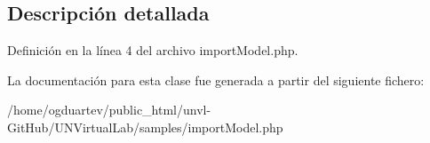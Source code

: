 \subsection{Descripción detallada}


Definición en la línea 4 del archivo import\+Model.\+php.



La documentación para esta clase fue generada a partir del siguiente fichero\+:\begin{DoxyCompactItemize}
\item 
/home/ogduartev/public\+\_\+html/unvl-\/\+Git\+Hub/\+U\+N\+Virtual\+Lab/samples/import\+Model.\+php\end{DoxyCompactItemize}
